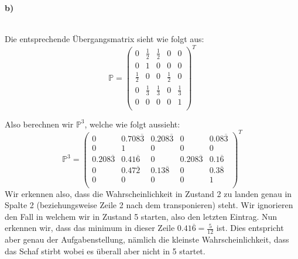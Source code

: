 \documentclass[a4paper]{article}
\begin{document}
\textbf{b)} 
\begin{center}
\end{center}
\\

Die entsprechende Übergangsmatrix sieht wie folgt aus:
\[
\mathbb{P} = \begin{pmatrix} 
	0 & \frac{ 1 }{ 2 } & \frac{ 1 }{ 2 } & 0 & 0 \\
	0 & 1 & 0 & 0 & 0 \\
	\frac{ 1 }{ 2 } & 0 & 0 & \frac{ 1 }{ 2 } & 0 \\
	0 & \frac{ 1 }{ 3 } & \frac{ 1 }{ 3 } & 0 & \frac{ 1 }{ 3 } \\
	0 & 0 & 0 & 0 & 1 \\
\end{pmatrix} ^{T}
\] 

Also berechnen wir $\mathbb{P} ^{3}$, welche wie folgt aussieht:
\[
\mathbb{P} ^{3} = \begin{pmatrix} 
	0 & 0.708 \overline{3} & 0.208 \overline{3} & 0 & 0.08 \overline{3} \\
	0 & 1 & 0 & 0 & 0 \\
	0.208 \overline{3} & 0.41 \overline{6} & 0 & 0.208 \overline{3} & 0.1 \overline{6} \\
	0 & 0.47 \overline{2} & 0.13 \overline{8} & 0 & 0.3 \overline{8} \\
	0 & 0 & 0 & 0 & 1 \\
\end{pmatrix} ^{T}
\] 
Wir erkennen also, dass die Wahrscheinlichkeit in Zustand 2 zu landen genau in Spalte 2
(beziehungsweise Zeile 2 nach dem transponieren) steht. 
Wir ignorieren den Fall in welchem wir in Zustand 5 starten, also den letzten Eintrag.
Nun erkennen wir, dass das minimum in dieser Zeile $0.41 \overline{6} = \frac{ 5 }{ 12 }$ ist. Dies entspricht aber genau
der Aufgabenstellung, nämlich die kleinste Wahrscheinlichkeit, dass das Schaf stirbt wobei es überall
aber nicht in 5 startet.
\end{document}
